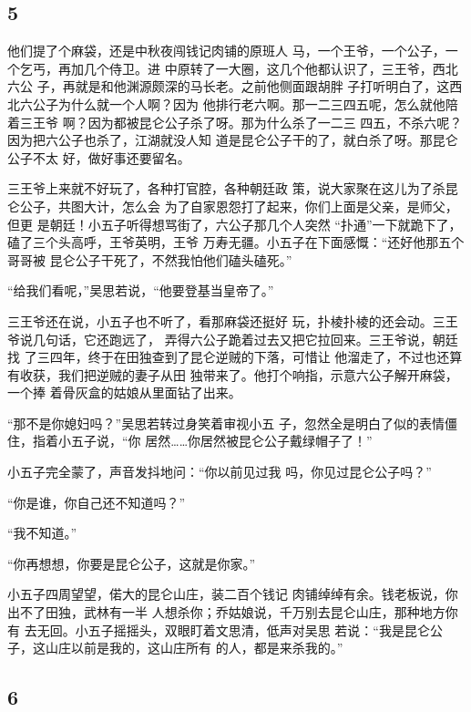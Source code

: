 {\centering\subsection{5}}

他们提了个麻袋，还是中秋夜闯钱记肉铺的原班人
马，一个王爷，一个公子，一个乞丐，再加几个侍卫。进
中原转了一大圈，这几个他都认识了，三王爷，西北六公
子，再就是和他渊源颇深的马长老。之前他侧面跟胡胖
子打听明白了，这西北六公子为什么就一个人啊？因为
他排行老六啊。那一二三四五呢，怎么就他陪着三王爷
啊？因为都被昆仑公子杀了呀。那为什么杀了一二三
四五，不杀六呢？因为把六公子也杀了，江湖就没人知
道是昆仑公子干的了，就白杀了呀。那昆仑公子不太
好，做好事还要留名。

三王爷上来就不好玩了，各种打官腔，各种朝廷政
策，说大家聚在这儿为了杀昆仑公子，共图大计，怎么会
为了自家恩怨打了起来，你们上面是父亲，是师父，但更
是朝廷！小五子听得想骂街了，六公子那几个人突然
“扑通”一下就跪下了，磕了三个头高呼，王爷英明，王爷
万寿无疆。小五子在下面感慨：“还好他那五个哥哥被
昆仑公子干死了，不然我怕他们磕头磕死。”

“给我们看呢，”吴思若说，“他要登基当皇帝了。”

三王爷还在说，小五子也不听了，看那麻袋还挺好
玩，扑棱扑棱的还会动。三王爷说几句话，它还跑远了，
弄得六公子跪着过去又把它拉回来。三王爷说，朝廷找
了三四年，终于在田独查到了昆仑逆贼的下落，可惜让
他溜走了，不过也还算有收获，我们把逆贼的妻子从田
独带来了。他打个响指，示意六公子解开麻袋，一个捧
着骨灰盒的姑娘从里面钻了出来。

“那不是你媳妇吗？”吴思若转过身笑着审视小五
子，忽然全是明白了似的表情僵住，指着小五子说，“你
居然……你居然被昆仑公子戴绿帽子了！”

小五子完全蒙了，声音发抖地问：“你以前见过我
吗，你见过昆仑公子吗？”

“你是谁，你自己还不知道吗？”

“我不知道。”

“你再想想，你要是昆仑公子，这就是你家。”

小五子四周望望，偌大的昆仑山庄，装二百个钱记
肉铺绰绰有余。钱老板说，你出不了田独，武林有一半
人想杀你；乔姑娘说，千万别去昆仑山庄，那种地方你有
去无回。小五子摇摇头，双眼盯着文思清，低声对吴思
若说：“我是昆仑公子，这山庄以前是我的，这山庄所有
的人，都是来杀我的。”
\newline

{\centering\subsection{6}}

